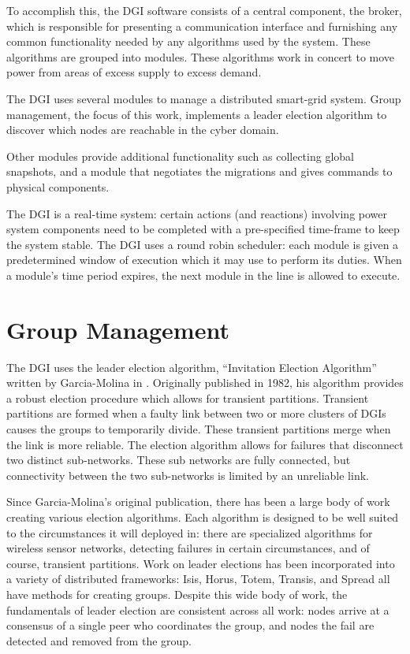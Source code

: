 To accomplish this, the DGI software consists of a central component, the
broker, which is responsible for presenting a communication interface and
furnishing any common functionality needed by any algorithms used by the
system. These algorithms are grouped into modules. These algorithms work in
concert to move power from areas of excess supply to excess demand.

The DGI uses several modules to manage a distributed smart-grid system. Group
management, the focus of this work, implements a leader election algorithm to
discover which nodes are reachable in the cyber domain.

Other modules provide additional functionality such as collecting global
snapshots, and a module that negotiates the migrations and gives commands to
physical components.

The DGI is a real-time system: certain actions (and reactions) involving power
system components need to be completed with a pre-specified time-frame to keep
the system stable. The DGI uses a round robin scheduler: each module is given
a predetermined window of execution which it may use to perform its duties. When
a module's time period expires, the next module in the line is allowed to
execute. 
 
\section{Group Management}
The DGI uses the leader election algorithm, ``Invitation Election
Algorithm'' written by Garcia-Molina in \cite{INVITATIONELECTION}.
Originally published in 1982, his algorithm provides a robust election 
procedure which allows for transient
partitions. Transient partitions are formed when a faulty link between two or
more clusters of DGIs causes the groups to temporarily divide. These transient
partitions merge when the link is more reliable. The election algorithm
allows for failures that disconnect two distinct sub-networks. These sub
networks are fully connected, but connectivity between the two sub-networks is
limited by an unreliable link.

Since Garcia-Molina's original publication, there has been a large body of
work creating various election algorithms. Each algorithm is
designed to be well suited to the circumstances it will deployed in: there are
specialized algorithms for wireless sensor
networks\cite{LE-WSN-1}\cite{LE-WSN-2}, detecting failures in
certain
circumstances\cite{LE-SPECIALCIRCUMSTANCES-1}\cite{LE-SPECIALCIRCUMSTANCES-2}, and of course, transient partitions. Work on leader
elections has been incorporated into a variety of distributed frameworks:
Isis\cite{ISISTOOLKIT},
Horus\cite{HORUSTOOLKIT}, Totem\cite{TOTEMTOOLKIT},
Transis\cite{TRANSISTOOLKIT}, and Spread\cite{SPREADTOOLKIT} all have methods for creating groups. Despite
this wide body of work, the fundamentals of leader election are consistent
across all work: nodes arrive at a consensus of a single peer who coordinates
the group, and nodes the fail are detected and removed from the group. 

